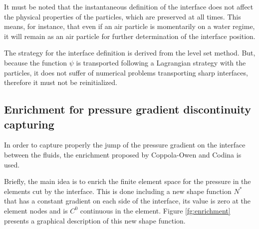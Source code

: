 \documentclass[a4paper,conference]{IEEEtran}
\begin{document}
    It must be noted that the instantaneous definition of the interface does not affect the physical properties of the particles, which are preserved at all times. This means, for instance, that even if an air particle is momentarily on a water regime, it will remain as an air particle for further determination of the interface position. 
    
    The strategy for the interface definition is derived from the level set method. But, because the function $\psi$ is transported following a Lagrangian strategy with the particles, it does not suffer of numerical problems transporting sharp interfaces, therefore it must not be reinitialized.

\subsection{Enrichment for pressure gradient discontinuity capturing}

  In order to capture properly the jump of the pressure gradient on the interface between the fluids, the enrichment proposed by Coppola-Owen and Codina\cite{Coppola05} is used.

  Briefly, the main idea is to enrich the finite element space for the pressure in the elements cut by the interface. This is done including a new shape function $N^*$ that has a constant gradient on each side of the interface, its value is zero at the element nodes and is $C^0$ continuous in the element. Figure \ref{fg:enrichment} presents a graphical description of this new shape function.
  
\end{document}
